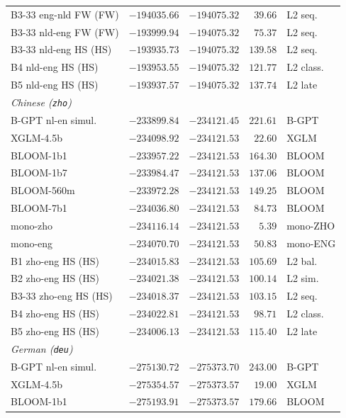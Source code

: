 \begin{table}[!ht]
\begin{tabular}{lrrrl}
    B3-33 eng-nld FW (FW) & $-194035.66$ & $-194075.32$ & $39.66$ & L2 seq. \\
    B3-33 nld-eng FW (FW) & $-193999.94$ & $-194075.32$ & $75.37$ & L2 seq. \\
    B3-33 nld-eng HS (HS) & $-193935.73$ & $-194075.32$ & $139.58$ & L2 seq. \\
    B4 nld-eng HS (HS) & $-193953.55$ & $-194075.32$ & $121.77$ & L2 class. \\
    B5 nld-eng HS (HS) & $-193937.57$ & $-194075.32$ & $137.74$ & L2 late \\
    \midrule
    \multicolumn{5}{l}{\textit{Chinese (\texttt{zho})}} \\
    \midrule
    B-GPT nl-en simul. & $-233899.84$ & $-234121.45$ & $221.61$ & B-GPT \\
    XGLM-4.5b & $-234098.92$ & $-234121.53$ & $22.60$ & XGLM \\
    BLOOM-1b1 & $-233957.22$ & $-234121.53$ & $164.30$ & BLOOM \\
    BLOOM-1b7 & $-233984.47$ & $-234121.53$ & $137.06$ & BLOOM \\
    BLOOM-560m & $-233972.28$ & $-234121.53$ & $149.25$ & BLOOM \\
    BLOOM-7b1 & $-234036.80$ & $-234121.53$ & $84.73$ & BLOOM \\
    mono-zho & $-234116.14$ & $-234121.53$ & $5.39$ & mono-ZHO \\
    mono-eng & $-234070.70$ & $-234121.53$ & $50.83$ & mono-ENG \\
    B1 zho-eng HS (HS) & $-234015.83$ & $-234121.53$ & $105.69$ & L2 bal. \\
    B2 zho-eng HS (HS) & $-234021.38$ & $-234121.53$ & $100.14$ & L2 sim. \\
    B3-33 zho-eng HS (HS) & $-234018.37$ & $-234121.53$ & $103.15$ & L2 seq. \\
    B4 zho-eng HS (HS) & $-234022.81$ & $-234121.53$ & $98.71$ & L2 class. \\
    B5 zho-eng HS (HS) & $-234006.13$ & $-234121.53$ & $115.40$ & L2 late \\
    \midrule
    \multicolumn{5}{l}{\textit{German (\texttt{deu})}} \\
    \midrule
    B-GPT nl-en simul. & $-275130.72$ & $-275373.70$ & $243.00$ & B-GPT \\
    XGLM-4.5b & $-275354.57$ & $-275373.57$ & $19.00$ & XGLM \\
    BLOOM-1b1 & $-275193.91$ & $-275373.57$ & $179.66$ & BLOOM \\

\end{tabular}
\end{table}

